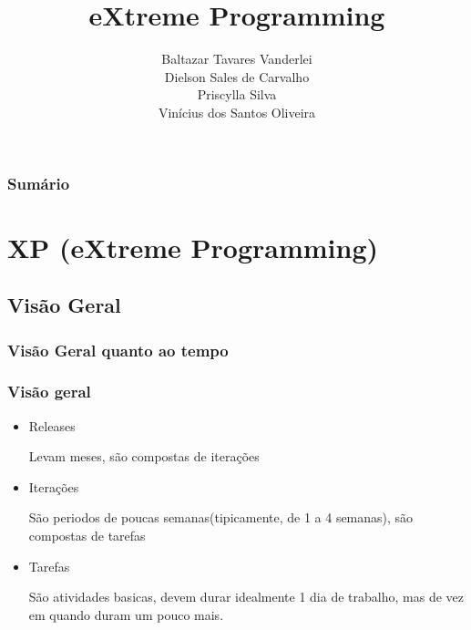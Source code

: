 \documentclass[10pt]{beamer}
\title[]{eXtreme Programming}
\author[]{Baltazar Tavares Vanderlei\\
Dielson Sales de Carvalho\\
Priscylla Silva\\
Vinícius dos Santos Oliveira}
\institute[2013]{Instituto de Computação - IC/UFAL}
\begin{document}
\newcommand{\til}{\~{}}

\frame{\titlepage}
\begin{frame}[t]
  \frametitle{Sumário}
  \tableofcontents[framebreaks]
\end{frame}




\section{XP (eXtreme Programming)}

\subsection{Visão Geral}

\begin{frame}
  \frametitle{Visão Geral quanto ao tempo}
  \begin{figure}
    \centering
  \end{figure}
\end{frame}


\begin{frame}
  \frametitle{Visão geral}
  \begin{itemize}%
  \item Releases
    \begin{block}{}
      Levam meses, são compostas de iterações
    \end{block}
  \item Iterações
    \begin{block}{}
      São periodos de poucas semanas(tipicamente, de 1 a 4 semanas), são compostas de tarefas
    \end{block}
  \item Tarefas
    \begin{block}{}
      São atividades basicas, devem durar idealmente 1 dia de trabalho, mas de vez em quando duram um pouco mais.
    \end{block}
  \end{itemize}
\end{frame}
\end{document}
